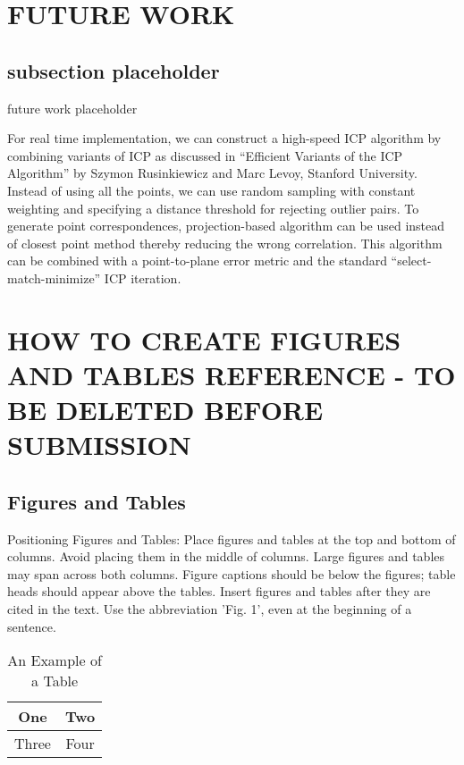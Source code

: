 \documentclass[letterpaper, 10 pt, conference]{ieeeconf}  %
\begin{document}
\section{FUTURE WORK}

\subsection{subsection placeholder}

future work placeholder


For real time implementation, we can construct a high-speed ICP algorithm by combining variants of ICP as discussed in “Efficient Variants of the ICP Algorithm” by Szymon Rusinkiewicz and Marc Levoy, Stanford University. Instead of using all the points, we can use random sampling with constant weighting and specifying a distance threshold for rejecting outlier pairs. To generate point correspondences, projection-based algorithm can be used instead of closest point method thereby reducing the wrong correlation. This algorithm can be combined with a point-to-plane error metric and the standard “select-match-minimize” ICP iteration. 


\section{HOW TO CREATE FIGURES AND TABLES REFERENCE - TO BE DELETED BEFORE SUBMISSION}
\subsection{Figures and Tables}

Positioning Figures and Tables: Place figures and tables at the top and bottom of columns. Avoid placing them in the middle of columns. Large figures and tables may span across both columns. Figure captions should be below the figures; table heads should appear above the tables. Insert figures and tables after they are cited in the text. Use the abbreviation 'Fig. 1', even at the beginning of a sentence.

\begin{table}[h]
\caption{An Example of a Table}
\label{table_example}
\begin{center}
\begin{tabular}{|c||c|}
\hline
One & Two\\
\hline
Three & Four\\
\hline
\end{tabular}
\end{center}
\end{table}
\end{document}
